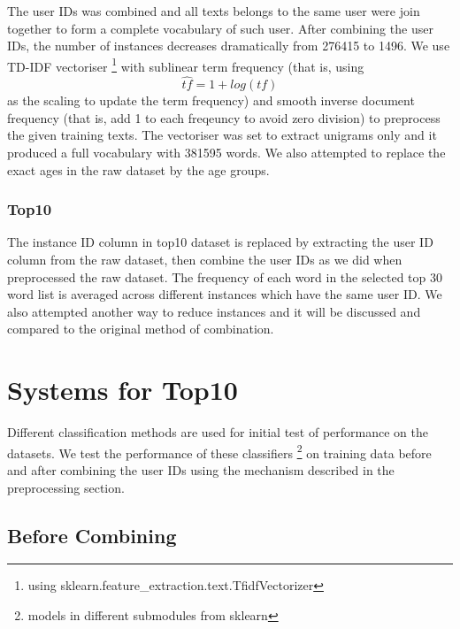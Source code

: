 \documentclass[10pt]{article}
\begin{document}
The user IDs was combined and all texts belongs to the same user were join together to form a complete vocabulary of such user. After combining the user IDs, the number of instances decreases dramatically from 276415 to 1496. We use TD-IDF vectoriser
\footnote{using sklearn.feature\_extraction.text.TfidfVectorizer}
with sublinear term frequency (that is, using
\begin{equation}\hat{tf}=1+log(tf)\end{equation}
as the scaling to update the term frequency) and smooth inverse document frequency (that is, add 1 to each freqeuncy to avoid zero division) to preprocess the given training texts. The vectoriser was set to extract unigrams only and it produced a full vocabulary with 381595 words. We also attempted to replace the exact ages in the raw dataset by the age groups.

\subsubsection{Top10}

The instance ID column in top10 dataset is replaced by extracting the user ID column from the raw dataset, then combine the user IDs as we did when preprocessed the raw dataset. The frequency of each word in the selected top 30 word list is averaged across different instances which have the same user ID. We also attempted another way to reduce instances and it will be discussed and compared to the original method of combination.

\section{Systems for Top10}

Different classification methods are used for initial test of performance on the datasets. We test the performance of these classifiers
\footnote{models in different submodules from sklearn}
on training data before and after combining the user IDs using the mechanism described in the preprocessing section.

\subsection{Before Combining}
\end{document}
